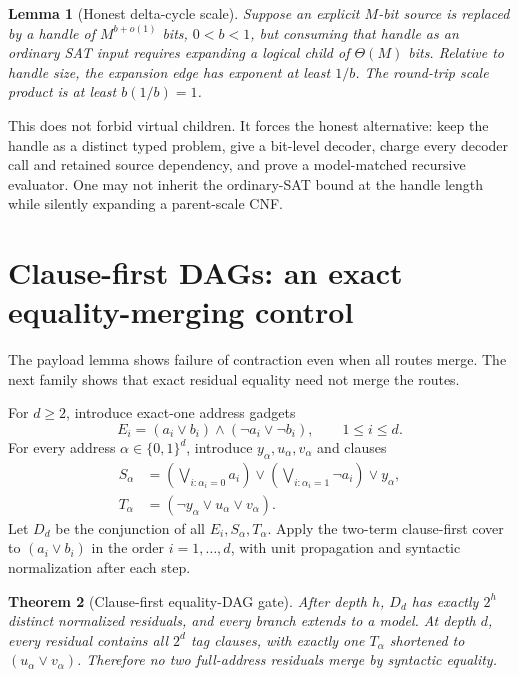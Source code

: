 \documentclass[11pt]{article}
\newtheorem{theorem}{Theorem}[section]
\newtheorem{lemma}[theorem]{Lemma}
\begin{document}
\begin{lemma}[Honest delta-cycle scale]
Suppose an explicit $M$-bit source is replaced by a handle of
$M^{b+o(1)}$ bits, $0<b<1$, but consuming that handle as an ordinary SAT input
requires expanding a logical child of $\Theta(M)$ bits.  Relative to handle
size, the expansion edge has exponent at least $1/b$.  The round-trip scale
product is at least $b(1/b)=1$.
\end{lemma}

This does not forbid virtual children.  It forces the honest alternative:
keep the handle as a distinct typed problem, give a bit-level decoder, charge
every decoder call and retained source dependency, and prove a model-matched
recursive evaluator.  One may not inherit the ordinary-SAT bound at the
handle length while silently expanding a parent-scale CNF.

\section{Clause-first DAGs: an exact equality-merging control}

The payload lemma shows failure of contraction even when all routes merge.
The next family shows that exact residual equality need not merge the routes.

For $d\ge2$, introduce exact-one address gadgets
\[
 E_i=(a_i\vee b_i)\wedge(\neg a_i\vee\neg b_i),
 \qquad 1\le i\le d.
\]
For every address $\alpha\in\{0,1\}^d$, introduce $y_\alpha,u_\alpha,v_\alpha$
and clauses
\begin{align*}
 S_\alpha&=\left(\bigvee_{i:\alpha_i=0}a_i\right)
 \vee\left(\bigvee_{i:\alpha_i=1}\neg a_i\right)\vee y_\alpha,\\
 T_\alpha&=(\neg y_\alpha\vee u_\alpha\vee v_\alpha).
\end{align*}
Let $D_d$ be the conjunction of all $E_i,S_\alpha,T_\alpha$.  Apply the
two-term clause-first cover to $(a_i\vee b_i)$ in the order $i=1,\ldots,d$,
with unit propagation and syntactic normalization after each step.

\begin{theorem}[Clause-first equality-DAG gate]
After depth $h$, $D_d$ has exactly $2^h$ distinct normalized residuals, and
every branch extends to a model.  At depth $d$, every residual contains all
$2^d$ tag clauses, with exactly one $T_\alpha$ shortened to
$(u_\alpha\vee v_\alpha)$.  Therefore no two full-address residuals merge by
syntactic equality.
\end{theorem}
\end{document}
